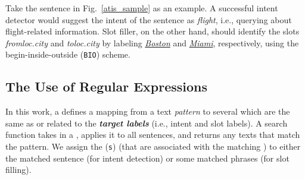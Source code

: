 %


Take the sentence in Fig.~\ref{atis_sample} as an example.
A successful intent detector would suggest the intent of the sentence as \emph{flight}, i.e., querying
about flight-related information. Slot filler, on the other hand, should identify the slots \emph{fromloc.city} and
\emph{toloc.city} by labeling \underline{\textit{Boston}} and \underline{\textit{Miami}}, respectively,
using the begin-inside-outside (\texttt{BIO}) scheme.




\subsection{The Use of Regular Expressions}
\label{re_desc} \vspace{-1mm}

In this work, a \RE defines a mapping from a text \emph{pattern} to several \textbf{\emph{\REtags}} which are  the same as or related to
the \textbf{\emph{target labels}} (i.e., intent and slot labels). A search function takes in a \RE, applies it to all sentences, and
returns any texts that match the pattern. We assign the \REtag(\texttt{s}) (that are associated with the matching \RE) to either the
matched sentence (for intent detection) or some matched phrases (for slot filling).


